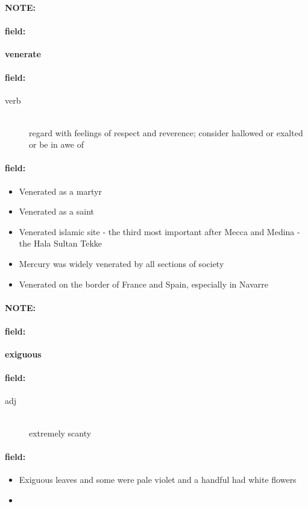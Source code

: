 \documentclass[12pt]{article}
\newenvironment{note}{\paragraph{NOTE:}}{}
\newenvironment{field}{\paragraph{field:}}{}
\begin{document}
\begin{note}
\begin{field}
\textbf{\large venerate}
\end{field}


\begin{field}
\begin{description}
\item[verb] \hfill \\ 
regard with feelings of respect and reverence; consider hallowed or exalted or be in awe of

\end{description}
\end{field}

\begin{field}
\begin{itemize}
\item Venerated as a martyr
\item Venerated as a saint
\item Venerated islamic site - the third most important after Mecca and Medina - the Hala Sultan Tekke
\item Mercury was widely venerated by all sections of society
\item Venerated on the border of France and Spain, especially in Navarre
\end{itemize}
\end{field}
\end{note}
\begin{note}
\begin{field}
\textbf{\large exiguous}
\end{field}


\begin{field}
\begin{description}
\item[adj] \hfill \\ 
extremely scanty

\end{description}
\end{field}

\begin{field}
\begin{itemize}
\item Exiguous leaves and some were pale violet and a handful had white flowers
\item 
\end{itemize}
\end{field}
\end{note}
\end{document}
